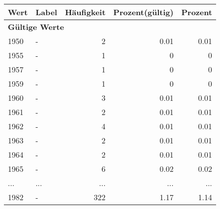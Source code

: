      \begin{longtable}{lXrrr}
     \toprule
     \textbf{Wert} & \textbf{Label} & \textbf{Häufigkeit} & \textbf{Prozent(gültig)} & \textbf{Prozent} \\
     \endhead
     \midrule
     \multicolumn{5}{l}{\textbf{Gültige Werte}}\\
        1950 & \multicolumn{1}{X}{-} & %
          \num{2} &
          \num[round-mode=places,round-precision=2]{0,01} &
          \num[round-mode=places,round-precision=2]{0,01} \\
        1955 & \multicolumn{1}{X}{-} & %
          \num{1} &
          \num[round-mode=places,round-precision=2]{0} &
          \num[round-mode=places,round-precision=2]{0} \\
        1957 & \multicolumn{1}{X}{-} & %
          \num{1} &
          \num[round-mode=places,round-precision=2]{0} &
          \num[round-mode=places,round-precision=2]{0} \\
        1959 & \multicolumn{1}{X}{-} & %
          \num{1} &
          \num[round-mode=places,round-precision=2]{0} &
          \num[round-mode=places,round-precision=2]{0} \\
        1960 & \multicolumn{1}{X}{-} & %
          \num{3} &
          \num[round-mode=places,round-precision=2]{0,01} &
          \num[round-mode=places,round-precision=2]{0,01} \\
        1961 & \multicolumn{1}{X}{-} & %
          \num{2} &
          \num[round-mode=places,round-precision=2]{0,01} &
          \num[round-mode=places,round-precision=2]{0,01} \\
        1962 & \multicolumn{1}{X}{-} & %
          \num{4} &
          \num[round-mode=places,round-precision=2]{0,01} &
          \num[round-mode=places,round-precision=2]{0,01} \\
        1963 & \multicolumn{1}{X}{-} & %
          \num{2} &
          \num[round-mode=places,round-precision=2]{0,01} &
          \num[round-mode=places,round-precision=2]{0,01} \\
        1964 & \multicolumn{1}{X}{-} & %
          \num{2} &
          \num[round-mode=places,round-precision=2]{0,01} &
          \num[round-mode=places,round-precision=2]{0,01} \\
        1965 & \multicolumn{1}{X}{-} & %
          \num{6} &
          \num[round-mode=places,round-precision=2]{0,02} &
          \num[round-mode=places,round-precision=2]{0,02} \\
       ... & ... & ... & ... & ... \\
        1982 & \multicolumn{1}{X}{-} & %
          \num{322} &
          \num[round-mode=places,round-precision=2]{1,17} &
          \num[round-mode=places,round-precision=2]{1,14} \\


\end{longtable}
